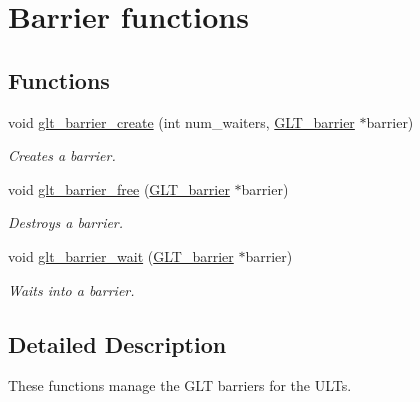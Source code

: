 \hypertarget{group__BARRIER}{\section{Barrier functions}
\label{group__BARRIER}
}
\subsection*{Functions}
\begin{DoxyCompactItemize}
\item 
void \hyperlink{group__BARRIER_ga18d85c9f60ef4fd9c51110e1aa688ba0}{glt\-\_\-barrier\-\_\-create} (int num\-\_\-waiters, \hyperlink{group__OBJECTS_ga80323c3be9c36c5b48c351c29e4a5a9b}{G\-L\-T\-\_\-barrier} $\ast$barrier)
\begin{DoxyCompactList}\small\item\em Creates a barrier. \end{DoxyCompactList}\item 
void \hyperlink{group__BARRIER_ga67a843c33805b0e3e9e1c37f079a7368}{glt\-\_\-barrier\-\_\-free} (\hyperlink{group__OBJECTS_ga80323c3be9c36c5b48c351c29e4a5a9b}{G\-L\-T\-\_\-barrier} $\ast$barrier)
\begin{DoxyCompactList}\small\item\em Destroys a barrier. \end{DoxyCompactList}\item 
void \hyperlink{group__BARRIER_gafb1627373ad29c1dd886c60608a3e74e}{glt\-\_\-barrier\-\_\-wait} (\hyperlink{group__OBJECTS_ga80323c3be9c36c5b48c351c29e4a5a9b}{G\-L\-T\-\_\-barrier} $\ast$barrier)
\begin{DoxyCompactList}\small\item\em Waits into a barrier. \end{DoxyCompactList}\end{DoxyCompactItemize}


\subsection{Detailed Description}
These functions manage the G\-L\-T barriers for the U\-L\-Ts. 

